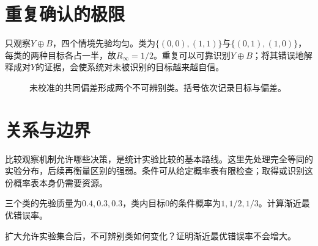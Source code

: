 \section{重复确认的极限}
只观察$Y\oplus B$，四个情境先验均匀。类为$\{(0,0),(1,1)\}$与$\{(0,1),(1,0)\}$，每类的两种目标各占一半，故$R_\infty=1/2$。重复可以可靠识别$Y\oplus B$；将其错误地解释成对$Y$的证据，会使系统对未被识别的目标越来越自信。

\begin{figure}[ht]
\centering
{}
\caption{未校准的共同偏差形成两个不可辨别类。括号依次记录目标与偏差。}
\end{figure}

\section{关系与边界}
比较观察机制允许哪些决策，是统计实验比较的基本路线\citep{blackwell1953}。这里先处理完全等同的实验分布，后续再衡量区别的强弱。条件可从给定概率表有限检查；取得或识别这份概率表本身仍需要资源。

\begin{exercise}三个类的先验质量为$0.4,0.3,0.3$，类内目标0的条件概率为$1,1/2,1/3$。计算渐近最优错误率。\end{exercise}
\begin{exercise}扩大允许实验集合后，不可辨别类如何变化？证明渐近最优错误率不会增大。\end{exercise}
